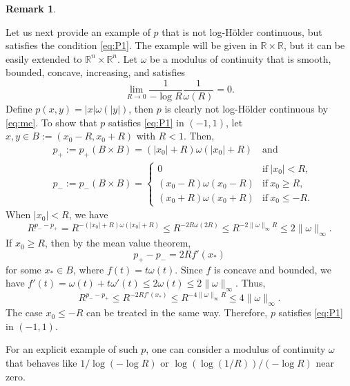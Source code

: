 \documentclass[11pt]{amsart}
\theoremstyle{plain}
\theoremstyle{definition}
\newtheorem{remark}[theorem]{Remark}
\numberwithin{equation}{section}
\begin{document}
\begin{remark}{\,  }
\begin{enumerate}[(i)]
Let us next provide an example of $p$ that is not log-H\"older continuous, but satisfies the condition \eqref{eq:P1}. The example will be given in $\mathbb{R} \times \mathbb{R}$, but it can be easily extended to $\mathbb{R}^n \times \mathbb{R}^n$. Let $\omega$ be a modulus of continuity that is smooth, bounded, concave, increasing, and satisfies
\begin{equation} \label{eq:mc}
\lim_{R \to 0} \frac{1}{-\log R}\frac{1}{\omega(R)} = 0.
\end{equation}
Define $p(x,y) = |x| \omega(|y|)$, then $p$ is clearly not log-H\"older continuous by \eqref{eq:mc}. To show that $p$ satisfies \eqref{eq:P1} in $(-1,1)$, let $x, y \in B:= (x_0-R, x_0+R)$ with $R < 1$. Then,
\begin{equation*}
\begin{split}
&p_+:= p_+(B \times B) = (|x_0|+R) \omega(|x_0|+R) \quad\text{and} \\
&p_-:= p_-(B \times B) = 
\begin{cases}
0 &\text{if}~ |x_0| < R, \\
(x_0-R) \omega(x_0-R) &\text{if}~ x_0 \geq R, \\
(x_0+R) \omega(x_0+R) &\text{if}~ x_0 \leq - R.
\end{cases}
\end{split}
\end{equation*}
When $|x_0|<R$, we have
\begin{equation*}
R^{p_--p_+} = R^{-(|x_0|+R)\omega(|x_0|+R)} \leq R^{-2R\omega(2R)} \leq R^{-2\|\omega\|_\infty R} \leq 2\|\omega\|_{\infty}.
\end{equation*}
If $x_0 \geq R$, then by the mean value theorem,
\begin{equation*}
p_+ - p_- = 2R f'(x_\ast)
\end{equation*}
for some $x_\ast \in B$, where $f(t) = t \omega(t)$. Since $f$ is concave and bounded, we have $f'(t) = \omega(t) + t\omega'(t) \leq 2\omega(t) \leq 2\|\omega\|_{\infty}$. Thus, 
\begin{equation*}
R^{p_--p_+} \leq R^{-2Rf'(x_\ast)} \leq R^{-4\|\omega\|_{\infty} R} \leq 4\|\omega\|_{\infty}.
\end{equation*}
The case $x_0 \leq -R$ can be treated in the same way. Therefore, $p$ satisfies \eqref{eq:P1} in $(-1,1)$.

For an explicit example of such $p$, one can consider a modulus of continuity $\omega$ that behaves like $1/\log(-\log R)$ or $\log(\log(1/ R))/(-\log R)$ near zero.


\end{enumerate}
\end{remark}
\end{document}
